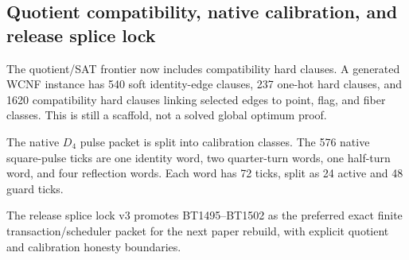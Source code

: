 \subsection{Quotient compatibility, native calibration, and release splice lock}
\label{sec:bt1501-bt1503-compat-calibration-release}

The quotient/SAT frontier now includes compatibility hard clauses.  A generated
WCNF instance has 540 soft identity-edge clauses, 237 one-hot hard clauses, and
1620 compatibility hard clauses linking selected edges to point, flag, and fiber
classes.  This is still a scaffold, not a solved global optimum proof.

The native \(D_4\) pulse packet is split into calibration classes.  The 576
native square-pulse ticks are one identity word, two quarter-turn words, one
half-turn word, and four reflection words.  Each word has 72 ticks, split as
24 active and 48 guard ticks.

The release splice lock v3 promotes BT1495--BT1502 as the preferred exact finite
transaction/scheduler packet for the next paper rebuild, with explicit quotient
and calibration honesty boundaries.
